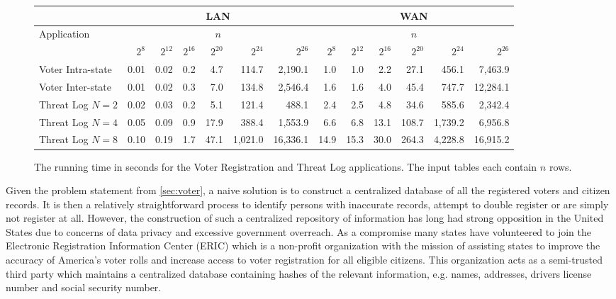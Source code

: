 \documentclass[11pt,letterpaper]{article}
\begin{document}
\begin{figure*}[t!]\centering\footnotesize
\begin{tabular}{|l|| r | r |r |r|r|r||r|r | r |r |r|r|}
		\cline{2-13}
		\multicolumn{1}{c}{}         & \multicolumn{6}{|c||}{LAN}                                   & \multicolumn{6}{|c|}{WAN}                                    \\ \hline
		\multirow{2}{*}{Application} &                  \multicolumn{6}{c||}{$n$}                   &                   \multicolumn{6}{c|}{$n$}                   \\
		& $2^8$ & $2^{12}$ & $2^{16}$ & $2^{20}$ & $2^{24}$ & $2^{26}$ & $2^8$ & $2^{12}$ & $2^{16}$ & $2^{20}$ & $2^{24}$ & $2^{26}$ \\ \hline\hline
		Voter Intra-state            & 0.01  & 0.02     & 0.2      & 4.7      &    114.7 &  2,190.1 &   1.0 &      1.0 & 2.2      & 27.1     & 456.1    &  7,463.9 \\ \hline
		Voter Inter-state            & 0.01  & 0.02     & 0.3      & 7.0      &    134.8 &  2,546.4 &   1.6 &      1.6 & 4.0      & 45.4     & 747.7    & 12,284.1 \\ \hline
		Threat Log $N=2$          & 0.02  & 0.03     & 0.2      & 5.1      &    121.4 &    488.1 &   2.4 &      2.5 & 4.8      & 34.6     & 585.6    &  2,342.4 \\ \hline
		Threat Log $N=4$           & 0.05  & 0.09     & 0.9      & 17.9     &    388.4 &  1,553.9 &   6.6 &      6.8 & 13.1     & 108.7    & 1,739.2  &  6,956.8 \\ \hline
		Threat Log $N=8$          & 0.10  & 0.19     & 1.7      & 47.1     &  1,021.0 & 16,336.1 &  14.9 &     15.3 & 30.0     & 264.3    & 4,228.8  & 16,915.2 \\ \hline
	\end{tabular}
\vspace{-0.3cm}
	\caption{\label{fig:app} The running time in seconds for the Voter Registration and Threat Log applications. The input tables each contain $n$ rows.  }
	\vspace{-0.3cm}
\end{figure*}

Given the problem statement from \ref{sec:voter}, a naive solution is to construct a centralized database of all the registered voters and citizen records. It is then a relatively straightforward process to identify persons with inaccurate records, attempt to double register or are simply not register at all. However, the construction of such a centralized repository of information has long had strong opposition in the United States due to concerns of data privacy and  excessive government overreach. As a compromise many states have volunteered to join the Electronic Registration Information Center (ERIC)\cite{eric} which is a non-profit organization with the mission of assisting states to improve the accuracy of America’s voter rolls and increase access to voter registration for all eligible citizens. This organization acts as a semi-trusted third party which maintains a centralized database containing hashes of the relevant information, e.g. names, addresses, drivers license number and social security number. 
\fi
\end{document}
